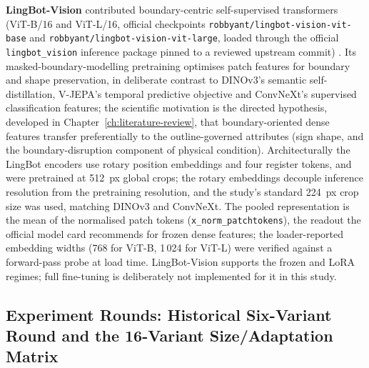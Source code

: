 \textbf{LingBot-Vision} contributed boundary-centric self-supervised transformers (ViT-B/16 and ViT-L/16, official checkpoints \texttt{robbyant/\allowbreak lingbot-\allowbreak vision-\allowbreak vit-\allowbreak base} and \texttt{robbyant/\allowbreak lingbot-\allowbreak vision-\allowbreak vit-\allowbreak large}, loaded through the official \texttt{lingbot\_vision} inference package pinned to a reviewed upstream commit) \citep{fu2026lingbot}. Its masked-boundary-modelling pretraining optimises patch features for boundary and shape preservation, in deliberate contrast to DINOv3's semantic self-distillation, V-JEPA's temporal predictive objective and ConvNeXt's supervised classification features; the scientific motivation is the directed hypothesis, developed in Chapter~\ref{ch:literature-review}, that boundary-oriented dense features transfer preferentially to the outline-governed attributes (sign shape, and the boundary-disruption component of physical condition). Architecturally the LingBot encoders use rotary position embeddings and four register tokens, and were pretrained at 512~px global crops; the rotary embeddings decouple inference resolution from the pretraining resolution, and the study's standard 224~px crop size was used, matching DINOv3 and ConvNeXt. The pooled representation is the mean of the normalised patch tokens (\texttt{x\_norm\_patchtokens}), the readout the official model card recommends for frozen dense features; the loader-reported embedding widths (768 for ViT-B, 1\,024 for ViT-L) were verified against a forward-pass probe at load time. LingBot-Vision supports the frozen and LoRA regimes; full fine-tuning is deliberately not implemented for it in this study.

\subsection{Experiment Rounds: Historical Six-Variant Round and the 16-Variant Size/Adaptation Matrix}
\label{subsec:attr-rounds}


